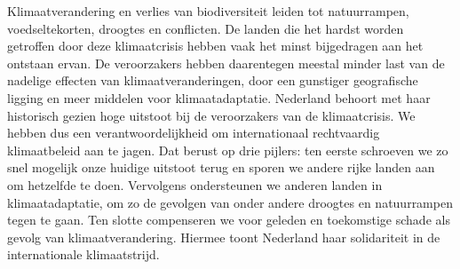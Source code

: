 
Klimaatverandering en verlies van biodiversiteit leiden tot natuurrampen, voedseltekorten, droogtes en conflicten. De landen die het hardst worden getroffen door deze klimaatcrisis hebben vaak het minst bijgedragen aan het ontstaan ervan. De veroorzakers hebben daarentegen meestal minder last van de nadelige effecten van klimaatveranderingen, door een gunstiger geografische ligging en meer middelen voor klimaatadaptatie. Nederland behoort met haar historisch gezien hoge uitstoot bij de veroorzakers van de klimaatcrisis. We hebben dus een verantwoordelijkheid om internationaal rechtvaardig klimaatbeleid aan te jagen. Dat berust op drie pijlers: ten eerste schroeven we zo snel mogelijk onze huidige uitstoot terug en sporen we andere rijke landen aan om hetzelfde te doen. Vervolgens ondersteunen we anderen landen in klimaatadaptatie, om zo de gevolgen van onder andere droogtes en natuurrampen tegen te gaan. Ten slotte compenseren we voor geleden en toekomstige schade als gevolg van klimaatverandering. Hiermee toont Nederland haar solidariteit in de internationale klimaatstrijd.
